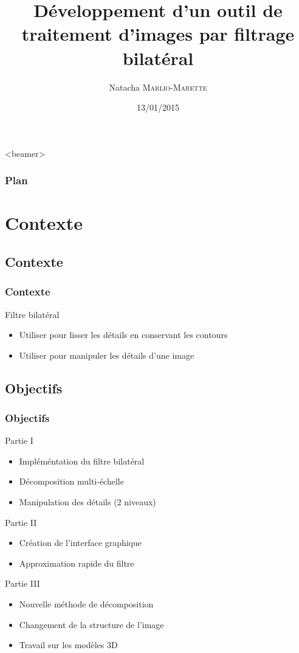 \documentclass{polytech-presentation}
\title{Développement d’un outil de traitement
d’images par filtrage bilatéral}
\author{Natacha \textsc{Marlio-Marette}}
\date{13/01/2015}
\begin{document}
\frame{\titlepage}	

	\begin{frame}<beamer>
    \frametitle{Plan}
    \tableofcontents
  \end{frame}

\section{Contexte}
	\subsection{Contexte}
		\begin{frame}
		\frametitle{Contexte}	
		\begin{block}{Filtre bilatéral}
		\begin{itemize}
			\item Utiliser pour lisser les détails en conservant les contours
			\item Utiliser pour manipuler les détails d'une image 
		\end{itemize}
		\end{block}			
		\end{frame}

	\subsection{Objectifs}
		\begin{frame}
		\frametitle{Objectifs}
			\begin{block}{Partie I}
				\begin{itemize}
					\item Impléméntation du filtre bilatéral
					\item Décomposition multi-échelle
					\item Manipulation des détails (2 niveaux)
				\end{itemize}
			\end{block}
		\pause
			\begin{block}{Partie II}
				\begin{itemize}
					\item Création de l'interface graphique
					\item Approximation rapide du filtre
				\end{itemize}
			\end{block}
		\end{frame}
		
		\begin{frame}
			\begin{block}{Partie III}
				\begin{itemize}
					\item Nouvelle méthode de décomposition
					\item Changement de la structure de l'image
					\item Travail sur les modèles 3D
				\end{itemize}
			\end{block}
		\end{frame}			
		
\end{document}
